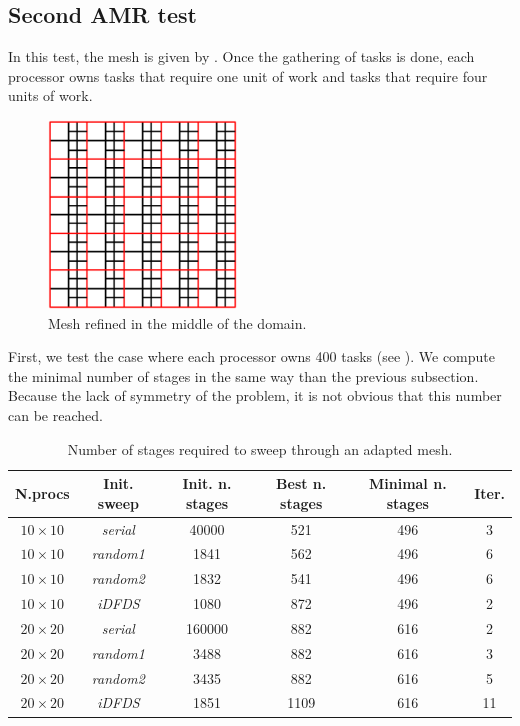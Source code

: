 \documentclass[letterpaper]{article}
\renewcommand{\(}{\left(}
\renewcommand{\)}{\right)}
\renewcommand{\[}{\left[}
\renewcommand{\]}{\right]}
\begin{document}
\subsection{Second AMR test}
In this test, the mesh is given by . Once the gathering of tasks is
done, each processor owns tasks that require one unit of work and tasks that
require four units of work.
\begin{figure}[H]
  \centering
  \includegraphics[width=5cm]{mesh_2}
  \caption{Mesh refined in the middle of the domain.}
  \label{mesh_2}
\end{figure}

First, we test the case where each processor owns 400 tasks (see ).
We compute the minimal number of stages in the same way than the previous subsection. Because
the lack of symmetry of the problem, it is not obvious that this number can be reached.
\begin{table}[H]
  \begin{center}
    \begin{tabular}{|c|c|c|c|c|c|}
      \hline
      N.procs & Init. sweep & Init. n. stages & Best n. stages & Minimal n. stages & Iter. \\
      \hline
      $10 \times 10$ &  \emph{serial} &  40000 &  521 & 496 &  3 \\
      $10 \times 10$ & \emph{random1} &   1841 &  562 & 496 &  6 \\
      $10 \times 10$ & \emph{random2} &   1832 &  541 & 496 &  6 \\
      $10 \times 10$ &   \emph{iDFDS} &   1080 &  872 & 496 &  2 \\
      $20 \times 20$ &  \emph{serial} & 160000 &  882 & 616 &  2 \\
      $20 \times 20$ & \emph{random1} &   3488 &  882 & 616 &  3 \\
      $20 \times 20$ & \emph{random2} &   3435 &  882 & 616 &  5 \\
      $20 \times 20$ &   \emph{iDFDS} &   1851 & 1109 & 616 & 11 \\
      \hline
    \end{tabular}
    \caption{Number of stages required to sweep through an adapted mesh.}
    \label{band_1}
  \end{center}
\end{table}
\end{document}
